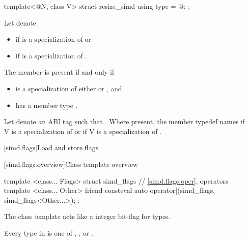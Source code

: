 \begin{itemdecl}
template<@\simdsizetype@ N, class V> struct resize_simd { using type = @\seebelow@; };
\end{itemdecl}

\begin{itemdescr}
  \pnum Let  denote
  \begin{itemize}
    \item {} if  is a specialization of
       or
    \item {} if  is a
      specialization of .
  \end{itemize}

  \pnum
  The member  is present if and only if
  \begin{itemize}
    \item {} is a specialization of either  or
      , and
    \item {} has a member type .
  \end{itemize}

  \pnum
  Let  denote an ABI tag such that .
  Where present, the member typedef  names  if \tcode V is a specialization of  or
   if \tcode V is a specialization of
  .
\end{itemdescr}

[simd.flags]{Load and store flags}

[simd.flags.overview]{Class template  overview}

\begin{codeblock}
template <class... Flags> struct simd_flags {
  // \ref{simd.flags.oper},  operators
  template <class... Other>
    friend consteval auto operator|(simd_flags, simd_flags<Other...>);
};
\end{codeblock}

\pnum
\begin{note}
The class template  acts like a integer bit-flag for types.
\end{note}

\pnum\constraints
Every type in  is one of \tcode{\convertflag},
\tcode{\alignedflag}, or .


